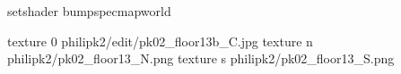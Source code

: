 setshader bumpspecmapworld

texture 0 philipk2/edit/pk02_floor13b_C.jpg
texture n philipk2/pk02_floor13_N.png
texture s philipk2/pk02_floor13_S.png

